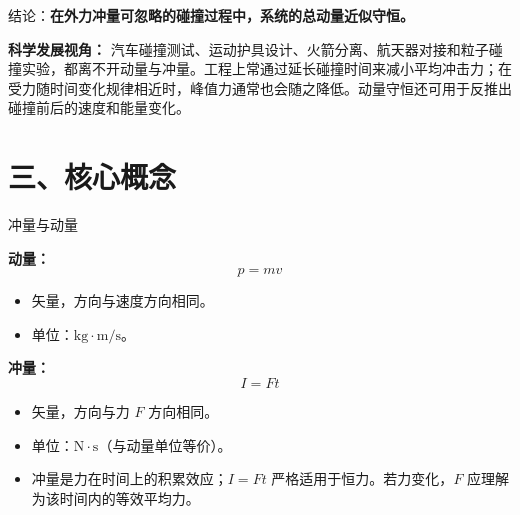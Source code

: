 结论：\textbf{在外力冲量可忽略的碰撞过程中，系统的总动量近似守恒。}

\textbf{科学发展视角：} 汽车碰撞测试、运动护具设计、火箭分离、航天器对接和粒子碰撞实验，都离不开动量与冲量。工程上常通过延长碰撞时间来减小平均冲击力；在受力随时间变化规律相近时，峰值力通常也会随之降低。动量守恒还可用于反推出碰撞前后的速度和能量变化。

\section*{三、核心概念}

\begin{conceptbox}{冲量与动量}

\textbf{动量：}
\[
\boxed{p = mv}
\]
\begin{itemize}
  \item 矢量，方向与速度方向相同。
  \item 单位：$\mathrm{kg \cdot m/s}$。
\end{itemize}

\textbf{冲量：}
\[
\boxed{I = F t}
\]
\begin{itemize}
  \item 矢量，方向与力 $F$ 方向相同。
  \item 单位：$\mathrm{N \cdot s}$（与动量单位等价）。
  \item 冲量是力在时间上的积累效应；$I=Ft$ 严格适用于恒力。若力变化，$F$ 应理解为该时间内的等效平均力。
\end{itemize}

\end{conceptbox}

